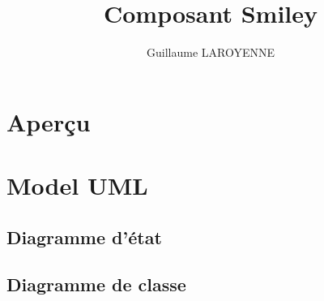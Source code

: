 \documentclass[a4paper,11pt]{article}
\title{Composant Smiley}
\author{Guillaume LAROYENNE}
\begin{document}
\maketitle
\tableofcontents

\begin{abstract}
\end{abstract}

\section{Aperçu}
\section{Model UML}
\subsection{Diagramme d'état}
\subsection{Diagramme de classe}

\section{}
\end{document}
